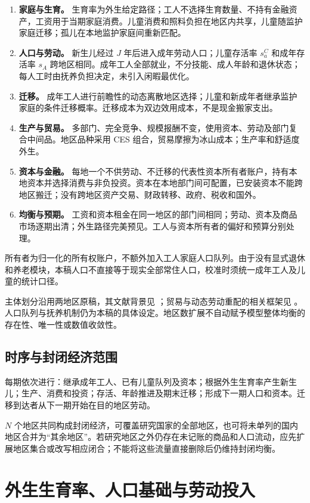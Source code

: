 \documentclass[UTF8,a4paper,zihao=-4,fontset=windows]{ctexart}
\numberwithin{equation}{section}
\begin{document}
\begin{enumerate}
 \item \textbf{家庭与生育。} 生育率为外生给定路径；工人不选择生育数量、不持有金融资产，工资用于当期家庭消费。儿童消费和照料负担在地区内共享，儿童随监护家庭迁移；孤儿在本地监护家庭间重新匹配。
 \item \textbf{人口与劳动。} 新生儿经过 $J$ 年后进入成年劳动人口；儿童存活率 $s^C_a$ 和成年存活率 $s_A$ 跨地区相同。成年工人全部就业，不分技能、成人年龄和退休状态；每人工时由抚养负担决定，未引入闲暇最优化。
 \item \textbf{迁移。} 成年工人进行前瞻性的动态离散地区选择；儿童和新成年者继承监护家庭的条件迁移概率。迁移成本为双边效用成本，不是现金搬家支出。
 \item \textbf{生产与贸易。} 多部门、完全竞争、规模报酬不变，使用资本、劳动及部门复合中间品。地区品种采用 CES 组合，贸易摩擦为冰山成本；生产率和舒适度外生。
 \item \textbf{资本与金融。} 每地一个不供劳动、不迁移的代表性资本所有者账户，持有本地资本并选择消费与非负投资。资本在本地部门间可配置，已安装资本不能跨地区搬迁；没有跨地区资产交易、财政转移、政府、税收和国外。
 \item \textbf{均衡与预期。} 工资和资本租金在同一地区的部门间相同；劳动、资本及商品市场逐期出清；外生路径完美预见。工人与资本所有者的偏好和预算分别处理。
\end{enumerate}
所有者为归一化的所有权账户，不额外加入工人家庭人口队列。由于没有显式退休和养老模块，本稿人口不直接等于现实全部常住人口，校准时须统一成年工人及儿童的统计口径。

主体划分沿用两地区原稿，其文献背景见 \citet{kleinman2023dynamic}；贸易与动态劳动重配的相关框架见 \citet{caliendo2019trade}。人口队列与抚养机制仍为本稿的具体设定。地区数扩展不自动赋予模型整体均衡的存在性、唯一性或数值收敛性。

\subsection{时序与封闭经济范围}
每期依次进行：继承成年工人、已有儿童队列及资本；根据外生生育率产生新生儿；生产、消费和投资；存活、年龄推进及期末迁移；形成下一期人口和资本。迁移到达者从下一期开始在目的地区劳动。

$N$ 个地区共同构成封闭经济，可覆盖研究国家的全部地区，也可将未单列的国内地区合并为“其余地区”。若研究地区之外仍存在未记账的商品和人口流动，应先扩展地区集合或改写相应闭合；不能将这些流量直接删除后仍维持封闭均衡。

\section{外生生育率、人口基础与劳动投入}
\label{sec:lg-fertility}
\end{document}
